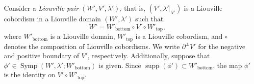 \documentclass[12pt]{article}
\theoremstyle{theorem}
\theoremstyle{definition}
\theoremstyle{remark}
\newtheorem{remark}[theorem]{Remark}
\numberwithin{equation}{section}
\newcommand{\p}{\partial}
\DeclareMathOperator{\bottom}{bottom}
\DeclareMathOperator{\topp}{top}
\DeclareMathOperator{\supp}{supp}
\DeclareMathOperator{\Symp}{Symp}
\begin{document}
Consider a \emph{Liouville pair} $(W',V',\lambda')$, that is, $(V',\lambda'|_{V'})$ is a Liouville cobordism in a Liouville domain $(W',\lambda')$ such that 
$$
W'=W'_{\bottom}\circ V' \circ W'_{\topp},$$
where $W'_{\bottom}$ is a Liouville domain, $W'_{\topp}$ is a Liouville cobordism, and $\circ$ denotes the composition of Liouville cobordisms.
We write $\p^\pm V'$ for the negative and positive boundary of $V'$, respectively.
Additionally, suppose that $\phi' \in \Symp(W',\lambda';W'_{\bottom})$ is given.
Since $\supp (\phi')\subset W'_{\bottom}$, the map $\phi'$ is the identity on $V'\circ W'_{\topp}$.\\
\end{document}

